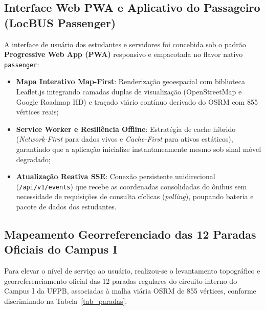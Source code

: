 \documentclass[lettersize,journal]{IEEEtran}
\begin{document}
\subsection{Interface Web PWA e Aplicativo do Passageiro (LocBUS Passenger)}
A interface de usuário dos estudantes e servidores foi concebida sob o padrão \textbf{Progressive Web App (PWA)} responsivo e empacotada no flavor nativo \texttt{passenger}:
\begin{itemize}
    \item \textbf{Mapa Interativo Map-First}: Renderização geoespacial com biblioteca Leaflet.js integrando camadas duplas de visualização (OpenStreetMap e Google Roadmap HD) e traçado viário contínuo derivado do OSRM com 855 vértices reais;
    \item \textbf{Service Worker e Resiliência Offline}: Estratégia de cache híbrido (\textit{Network-First} para dados vivos e \textit{Cache-First} para ativos estáticos), garantindo que a aplicação inicialize instantaneamente mesmo sob sinal móvel degradado;
    \item \textbf{Atualização Reativa SSE}: Conexão persistente unidirecional (\texttt{/api/v1/events}) que recebe as coordenadas consolidadas do ônibus sem necessidade de requisições de consulta cíclicas (\textit{polling}), poupando bateria e pacote de dados dos estudantes.
\end{itemize}

\subsection{Mapeamento Georreferenciado das 12 Paradas Oficiais do Campus I}
Para elevar o nível de serviço ao usuário, realizou-se o levantamento topográfico e georreferenciamento oficial das 12 paradas regulares do circuito interno do Campus I da UFPB, associadas à malha viária OSRM de 855 vértices, conforme discriminado na Tabela~\ref{tab_paradas}.
\end{document}
